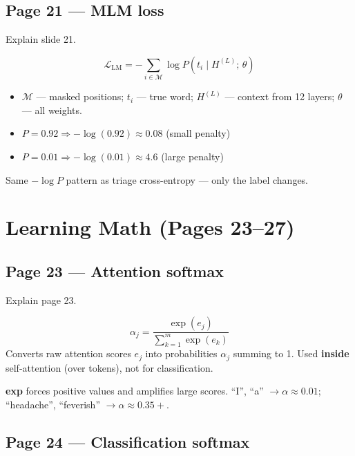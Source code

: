 \documentclass[11pt]{article}
\begin{document}
\subsection{Page 21 --- MLM loss}

\begin{questionbox}
Explain slide 21.
\end{questionbox}

\begin{answerbox}
\[
\mathcal{L}_{\mathrm{LM}} = -\sum_{i \in \mathcal{M}} \log P(t_i \mid H^{(L)};\, \theta)
\]
\begin{itemize}
  \item $\mathcal{M}$ --- masked positions; $t_i$ --- true word; $H^{(L)}$ --- context from 12 layers; $\theta$ --- all weights.
  \item $P = 0.92 \Rightarrow -\log(0.92) \approx 0.08$ (small penalty)
  \item $P = 0.01 \Rightarrow -\log(0.01) \approx 4.6$ (large penalty)
\end{itemize}
Same $-\log P$ pattern as triage cross-entropy --- only the label changes.
\end{answerbox}

\section{Learning Math (Pages 23--27)}

\subsection{Page 23 --- Attention softmax}

\begin{questionbox}
Explain page 23.
\end{questionbox}

\begin{answerbox}
\[
\alpha_j = \frac{\exp(e_j)}{\sum_{k=1}^{m}\exp(e_k)}
\]
Converts raw attention scores $e_j$ into probabilities $\alpha_j$ summing to 1. Used \textbf{inside} self-attention (over tokens), not for classification.

\textbf{exp} forces positive values and amplifies large scores. ``I'', ``a'' $\to \alpha \approx 0.01$; ``headache'', ``feverish'' $\to \alpha \approx 0.35+$.
\end{answerbox}

\subsection{Page 24 --- Classification softmax}
\end{document}
